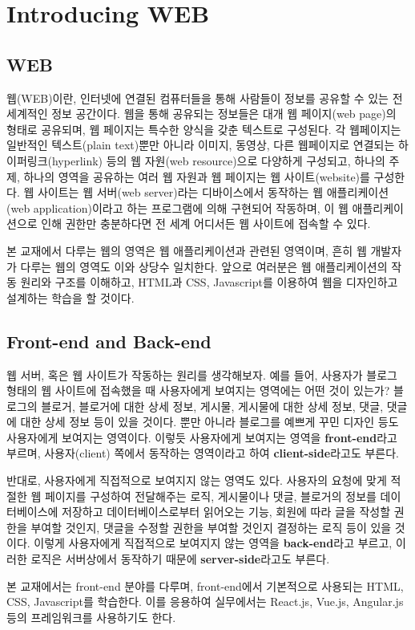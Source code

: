 \section{Introducing WEB} \label{sect:introducing-web}

\subsection*{WEB}
웹(WEB)이란, 인터넷에 연결된 컴퓨터들을 통해 사람들이 정보를 공유할 수 있는 전 세계적인 정보 공간이다. 웹을 통해 공유되는 정보들은 대개 웹 페이지(web page)의 형태로 공유되며, 웹 페이지는 특수한 양식을 갖춘 텍스트로 구성된다. 각 웹페이지는 일반적인 텍스트(plain text)뿐만 아니라 이미지, 동영상, 다른 웹페이지로 연결되는 하이퍼링크(hyperlink) 등의 웹 자원(web resource)으로 다양하게 구성되고, 하나의 주제, 하나의 영역을 공유하는 여러 웹 자원과 웹 페이지는 웹 사이트(website)를 구성한다. 웹 사이트는 웹 서버(web server)라는 디바이스에서 동작하는 웹 애플리케이션(web application)이라고 하는 프로그램에 의해 구현되어 작동하며, 이 웹 애플리케이션으로 인해 권한만 충분하다면 전 세계 어디서든 웹 사이트에 접속할 수 있다.

본 교재에서 다루는 웹의 영역은 웹 애플리케이션과 관련된 영역이며, 흔히 웹 개발자가 다루는 웹의 영역도 이와 상당수 일치한다. 앞으로 여러분은 웹 애플리케이션의 작동 원리와 구조를 이해하고, HTML과 CSS, Javascript를 이용하여 웹을 디자인하고 설계하는 학습을 할 것이다.

\subsection*{Front-end and Back-end}
웹 서버, 혹은 웹 사이트가 작동하는 원리를 생각해보자. 예를 들어, 사용자가 블로그 형태의 웹 사이트에 접속했을 때 사용자에게 보여지는 영역에는 어떤 것이 있는가? 블로그의 블로거, 블로거에 대한 상세 정보, 게시물, 게시물에 대한 상세 정보, 댓글, 댓글에 대한 상세 정보 등이 있을 것이다. 뿐만 아니라 블로그를 예쁘게 꾸민 디자인 등도 사용자에게 보여지는 영역이다. 이렇듯 사용자에게 보여지는 영역을 \textbf{front-end}라고 부르며, 사용자(client) 쪽에서 동작하는 영역이라고 하여 \textbf{client-side}라고도 부른다.

반대로, 사용자에게 직접적으로 보여지지 않는 영역도 있다. 사용자의 요청에 맞게 적절한 웹 페이지를 구성하여 전달해주는 로직, 게시물이나 댓글, 블로거의 정보를 데이터베이스에 저장하고 데이터베이스로부터 읽어오는 기능, 회원에 따라 글을 작성할 권한을 부여할 것인지, 댓글을 수정할 권한을 부여할 것인지 결정하는 로직 등이 있을 것이다. 이렇게 사용자에게 직접적으로 보여지지 않는 영역을 \textbf{back-end}라고 부르고, 이러한 로직은 서버상에서 동작하기 때문에 \textbf{server-side}라고도 부른다.

    {}

본 교재에서는 front-end 분야를 다루며, front-end에서 기본적으로 사용되는 HTML, CSS, Javascript를 학습한다. 이를 응용하여 실무에서는 React.js, Vue.js, Angular.js 등의 프레임워크를 사용하기도 한다.
